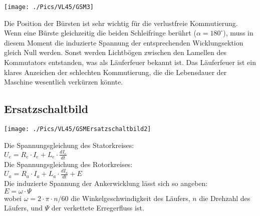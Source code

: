 \begin{minipage}{0.4 \linewidth}
\texttt{[image: ./Pics/VL45/GSM3]}
\end{minipage}
\begin{minipage}{0.6\linewidth}
Die Position der Bürsten ist sehr wichtig für die verlustfreie Kommutierung. Wenn eine Bürste gleichzeitig die beiden Schleifringe berührt ($\alpha = 180^\circ$), muss in diesem Moment die induzierte Spannung der entsprechenden Wicklungsektion gleich Null werden. Sonst werden Lichtbögen zwischen den Lamellen des Kommutators entstanden, was als Läuferfeuer bekannt ist. Das Läuferfeuer ist ein klares Anzeichen der schlechten Kommutierung, die die Lebensdauer der Maschine wesentlich verkürzen könnte.
\end{minipage}

\subsection{Ersatzschaltbild}
\begin{minipage}{0.4 \linewidth}
\texttt{[image: ./Pics/VL45/GSMErsatzschaltbild2]}
\end{minipage}
\begin{minipage}{0.6\linewidth}
Die Spannungsgleichung des Statorkreises: \\

$U_e = R_e \cdot I_e + L_e \cdot \frac{dI_e}{dt}$ \\

Die Spannungsgleichung des Rotorkreises: \\

$U_a = R_a \cdot I_a + L_a \cdot \frac{dI_a}{dt} + E $\\

Die induzierte Spannung der Ankerwicklung lässt sich so angeben: \\

$E = \omega \cdot \Psi$\\

wobei $\omega = 2 \cdot \pi \cdot n / 60$ die Winkelgeschwindigkeit des Läufers, $n$ die Drehzahl des Läufers, und $\Psi$ der verkettete Erregerfluss ist. 
\end{minipage}

